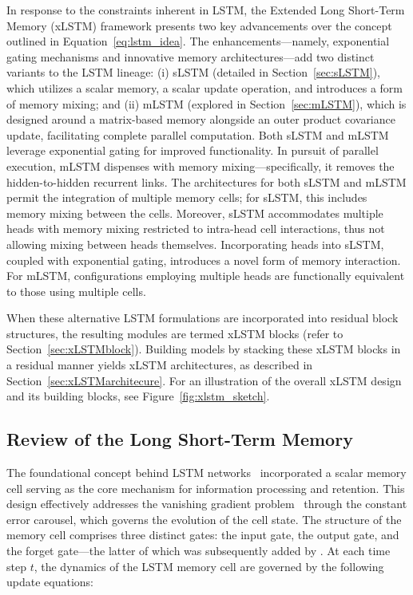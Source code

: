 In response to the constraints inherent in LSTM, the Extended Long Short-Term Memory (xLSTM) framework presents two key advancements over the concept outlined in Equation~\eqref{eq:lstm_idea}. The enhancements—namely, exponential gating mechanisms and innovative memory architectures—add two distinct variants to the LSTM lineage: (i) sLSTM (detailed in Section~\ref{sec:sLSTM}), which utilizes a scalar memory, a scalar update operation, and introduces a form of memory mixing; and (ii) mLSTM (explored in Section~\ref{sec:mLSTM}), which is designed around a matrix-based memory alongside an outer product covariance update, facilitating complete parallel computation. Both sLSTM and mLSTM leverage exponential gating for improved functionality. In pursuit of parallel execution, mLSTM dispenses with memory mixing—specifically, it removes the hidden-to-hidden recurrent links. The architectures for both sLSTM and mLSTM permit the integration of multiple memory cells; for sLSTM, this includes memory mixing between the cells. Moreover, sLSTM accommodates multiple heads with memory mixing restricted to intra-head cell interactions, thus not allowing mixing between heads themselves. Incorporating heads into sLSTM, coupled with exponential gating, introduces a novel form of memory interaction. For mLSTM, configurations employing multiple heads are functionally equivalent to those using multiple cells.

When these alternative LSTM formulations are incorporated into residual block structures, the resulting modules are termed xLSTM blocks (refer to Section~\ref{sec:xLSTMblock}). Building models by stacking these xLSTM blocks in a residual manner yields xLSTM architectures, as described in Section~\ref{sec:xLSTMarchitecure}. For an illustration of the overall xLSTM design and its building blocks, see Figure~\ref{fig:xlstm_sketch}.

\subsection{Review of the Long Short-Term Memory}
\label{sec:orgLSTM}

The foundational concept behind LSTM networks~\citep{Hochreiter:91,Hochreiter:97nips,Hochreiter:97} incorporated a scalar memory cell serving as the core mechanism for information processing and retention. This design effectively addresses the vanishing gradient problem~\citep{Hochreiter:91,Hochreiter:00book} through the constant error carousel, which governs the evolution of the cell state. The structure of the memory cell comprises three distinct gates: the input gate, the output gate, and the forget gate—the latter of which was subsequently added by \citet{Gers:00}. At each time step $t$, the dynamics of the LSTM memory cell are governed by the following update equations:

